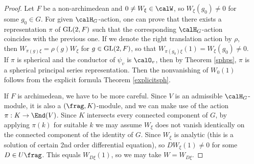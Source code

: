 \begin{proof}
Let $F$ be a non-archimedean and $0\neq W_{\xi}\in \calW$, so $W_{\xi}(g_0)\neq 0$ for some $g_0\in G$. For given $\calH_G$-action, one can prove that there exists a representation $\pi$ of $\mathrm{GL}(2, F)$ such that the corresponding $\calH_G$-action coincides with the previous one. If we denote the right translation action by $\rho$, then $W_{\pi(g)\xi} = \rho(g)W_{\xi}$ for $g\in \mathrm{GL}(2, F)$, so that $W_{\pi(g_{0})\xi} (1) = W_{\xi}(g_0)\neq 0$.
If $\pi$ is spherical and the conductor of $\psi_v$ is $\calO_v$, then by Theorem \ref{sphps}, $\pi$ is a spherical principal series representation. Then the nonvanishing of $W_{0}(1)$ follows from the explicit formula Theorem \ref{explicitsph}. 

If $F$ is archimedean, we have to be more careful.  
Since $V$ is an admissible $\calH_G$-module, it is also a $(\frag, K)$-module, and we can make use of the action $\pi : K\to \End(V)$. Since $K$ intersects every connected component of $G$, by applying $\pi(k)$ for suitable $k$ we may assume $W_{\xi}$ does not vanish identically on the connected component of the identity of $G$. 
Since $W_{\xi}$ is analytic (this is a solution of certain 2nd order differential equation), so $DW_{\xi}(1)\neq 0$ for some $D\in U\frag$. 
This equals $W_{D\xi}(1)$, so we may take $W = W_{D\xi}$. 
\end{proof}


